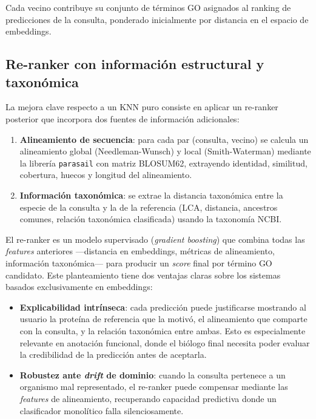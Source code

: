 \documentclass[11pt,a4paper]{article}
\begin{document}
Cada vecino contribuye su conjunto de términos GO asignados al ranking de
predicciones de la consulta, ponderado inicialmente por distancia en el espacio
de embeddings.

\subsection{Re-ranker con información estructural y taxonómica}

La mejora clave respecto a un KNN puro consiste en aplicar un re-ranker
posterior que incorpora dos fuentes de información adicionales:

\begin{enumerate}[leftmargin=1.5em]
  \item \textbf{Alineamiento de secuencia}: para cada par (consulta, vecino) se
    calcula un alineamiento global (Needleman-Wunsch) y local (Smith-Waterman)
    mediante la librería \texttt{parasail} con matriz BLOSUM62, extrayendo
    identidad, similitud, cobertura, huecos y longitud del alineamiento.
  \item \textbf{Información taxonómica}: se extrae la distancia taxonómica
    entre la especie de la consulta y la de la referencia (LCA, distancia,
    ancestros comunes, relación taxonómica clasificada) usando la taxonomía
    NCBI.
\end{enumerate}

El re-ranker es un modelo supervisado (\emph{gradient boosting}) que combina
todas las \emph{features} anteriores —distancia en embeddings, métricas de
alineamiento, información taxonómica— para producir un \emph{score} final por
término GO candidato. Este planteamiento tiene dos ventajas claras sobre los
sistemas basados exclusivamente en embeddings:

\begin{itemize}[leftmargin=1.5em]
  \item \textbf{Explicabilidad intrínseca}: cada predicción puede justificarse
    mostrando al usuario la proteína de referencia que la motivó, el
    alineamiento que comparte con la consulta, y la relación taxonómica entre
    ambas. Esto es especialmente relevante en anotación funcional, donde el
    biólogo final necesita poder evaluar la credibilidad de la predicción
    antes de aceptarla.
  \item \textbf{Robustez ante \emph{drift} de dominio}: cuando la consulta
    pertenece a un organismo mal representado, el re-ranker puede compensar
    mediante las \emph{features} de alineamiento, recuperando capacidad
    predictiva donde un clasificador monolítico falla silenciosamente.
\end{itemize}
\end{document}
